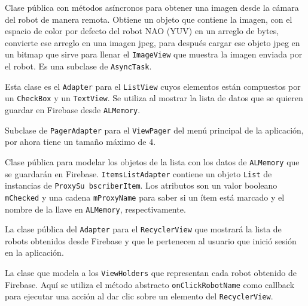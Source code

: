 
Clase pública con métodos asíncronos para obtener una imagen desde la cámara del robot de manera remota.  Obtiene un objeto que contiene la imagen, con el espacio de color por defecto del robot NAO (YUV) en un arreglo de bytes, convierte ese arreglo en una imagen jpeg, para después cargar ese objeto jpeg en un bitmap que sirve para llenar el \texttt{ImageView} que muestra la imagen enviada por el robot. Es una subclase
de \texttt{AsyncTask}.


Esta clase es el \texttt{Adapter} para el \texttt{ListView} cuyos elementos 
están compuestos por un \texttt{CheckBox} y un \texttt{TextView}. Se 
utiliza al mostrar la lista de datos que se quieren guardar en 
Firebase desde \texttt{ALMemory}.


Subclase de \texttt{PagerAdapter} para el \texttt{ViewPager} del menú
principal de la aplicación, por ahora tiene un tamaño máximo de 4. 


Clase pública para modelar los objetos de la lista con los datos de \texttt{ALMemory} que se guardarán en Firebase. \texttt{ItemsListAdapter} contiene un objeto \texttt{List} de
instancias de \texttt{ProxySu	bscriberItem}. Los
atributos son un  valor booleano \texttt{mChecked} y una cadena \texttt{mProxyName} para saber si un ítem está marcado y el nombre
de la llave en \texttt{ALMemory}, respectivamente.


La clase pública del \texttt{Adapter} para el \texttt{RecyclerView} que mostrará la lista de robots obtenidos desde Firebase y que le pertenecen al
usuario que inició sesión en la aplicación.


La clase que modela a los \texttt{ViewHolders} que representan cada robot obtenido de Firebase.
Aquí se utiliza el método abstracto \texttt{onClickRobotName} como callback para ejecutar una acción al dar clic sobre un elemento del \texttt{RecyclerView}.


